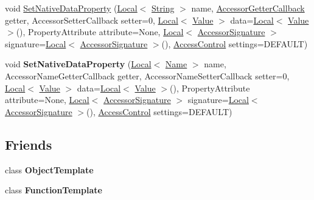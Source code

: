 \begin{DoxyCompactItemize}
\item 
void \hyperlink{classv8_1_1Template_ae23966bef9b32df6ced859a39b4a1f19}{Set\+Native\+Data\+Property} (\hyperlink{classv8_1_1Local}{Local}$<$ \hyperlink{classv8_1_1String}{String} $>$ name, \hyperlink{namespacev8_a722613c87061708a4f1aa050d095f868}{Accessor\+Getter\+Callback} getter, Accessor\+Setter\+Callback setter=0, \hyperlink{classv8_1_1Local}{Local}$<$ \hyperlink{classv8_1_1Value}{Value} $>$ data=\hyperlink{classv8_1_1Local}{Local}$<$ \hyperlink{classv8_1_1Value}{Value} $>$(), Property\+Attribute attribute=None, \hyperlink{classv8_1_1Local}{Local}$<$ \hyperlink{classv8_1_1AccessorSignature}{Accessor\+Signature} $>$ signature=\hyperlink{classv8_1_1Local}{Local}$<$ \hyperlink{classv8_1_1AccessorSignature}{Accessor\+Signature} $>$(), \hyperlink{namespacev8_a31d8355cb043d7d2dda3f4a52760b64e}{Access\+Control} settings=D\+E\+F\+A\+U\+L\+T)
\item 
\hypertarget{classv8_1_1Template_a9aebe244ed9f88d7653bfbecb4e62026}{}void {\bfseries Set\+Native\+Data\+Property} (\hyperlink{classv8_1_1Local}{Local}$<$ \hyperlink{classv8_1_1Name}{Name} $>$ name, Accessor\+Name\+Getter\+Callback getter, Accessor\+Name\+Setter\+Callback setter=0, \hyperlink{classv8_1_1Local}{Local}$<$ \hyperlink{classv8_1_1Value}{Value} $>$ data=\hyperlink{classv8_1_1Local}{Local}$<$ \hyperlink{classv8_1_1Value}{Value} $>$(), Property\+Attribute attribute=None, \hyperlink{classv8_1_1Local}{Local}$<$ \hyperlink{classv8_1_1AccessorSignature}{Accessor\+Signature} $>$ signature=\hyperlink{classv8_1_1Local}{Local}$<$ \hyperlink{classv8_1_1AccessorSignature}{Accessor\+Signature} $>$(), \hyperlink{namespacev8_a31d8355cb043d7d2dda3f4a52760b64e}{Access\+Control} settings=D\+E\+F\+A\+U\+L\+T)\label{classv8_1_1Template_a9aebe244ed9f88d7653bfbecb4e62026}

\end{DoxyCompactItemize}
\subsection*{Friends}
\begin{DoxyCompactItemize}
\item 
\hypertarget{classv8_1_1Template_a4d28646409234f556983be8a96c06424}{}class {\bfseries Object\+Template}\label{classv8_1_1Template_a4d28646409234f556983be8a96c06424}

\item 
\hypertarget{classv8_1_1Template_a334168ad1a5f39cf17b818ca3356aacd}{}class {\bfseries Function\+Template}\label{classv8_1_1Template_a334168ad1a5f39cf17b818ca3356aacd}

\end{DoxyCompactItemize}


